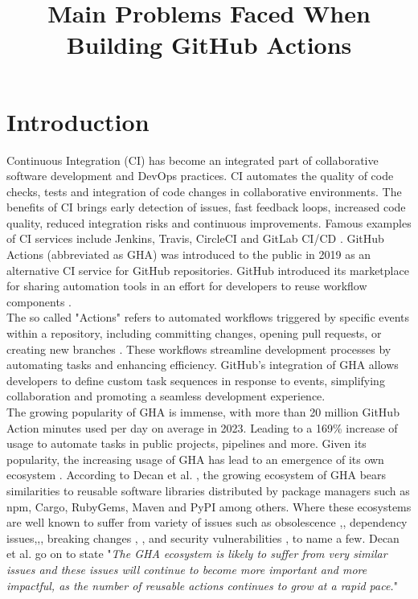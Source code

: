 \documentclass[conference]{IEEEtran}
\begin{document}
\title{Main Problems Faced When Building GitHub Actions\\
}

\author{
}

\maketitle


\section{Introduction}
Continuous Integration (CI) has become an integrated part of collaborative software development and DevOps practices. CI automates the quality of code checks, tests and integration of code changes in collaborative environments. The benefits of CI brings early detection of issues, fast feedback loops, increased code quality, reduced integration risks and continuous improvements. Famous examples of CI services include Jenkins, Travis, CircleCI and GitLab CI/CD \cite{b1}. GitHub Actions (abbreviated as GHA) was introduced to the public in 2019 as an alternative CI service for GitHub repositories. GitHub introduced its marketplace for sharing automation tools in an effort for developers to reuse workflow components \cite{b2}. \\ 
The so called "Actions" refers to automated workflows triggered by specific events within a repository, including committing changes, opening pull requests, or creating new branches \cite{b14}. These workflows streamline development processes by automating tasks and enhancing efficiency. GitHub's integration of GHA allows developers to define custom task sequences in response to events, simplifying collaboration and promoting a seamless development experience. \\
The growing popularity of GHA is immense, with more than 20 million GitHub Action minutes used per day on average in 2023. Leading to a 169\% increase of usage to automate tasks in public projects,  pipelines and more\cite{b3}. Given its popularity,  the increasing usage of GHA has lead to an emergence of its own ecosystem \cite{b4}.  According to Decan et al. \cite{b4}, the growing ecosystem of GHA bears similarities to reusable software libraries distributed by package managers such as npm, Cargo, RubyGems, Maven and PyPI among others. Where these ecosystems are well known to suffer from variety of issues such as obsolescence \cite{b5},\cite{b6}, dependency issues\cite{b7},\cite{b8},\cite{b9}, breaking changes \cite{b10}, \cite{b11}, and security vulnerabilities \cite{b12}, \cite{b13} to name a few. Decan et al. \cite{b4} go on to state "\textit{The GHA ecosystem is likely to suffer from very similar issues and these issues will continue to become more important and more impactful, as the number of reusable actions continues to grow at a rapid pace.}"\\
\end{document}
